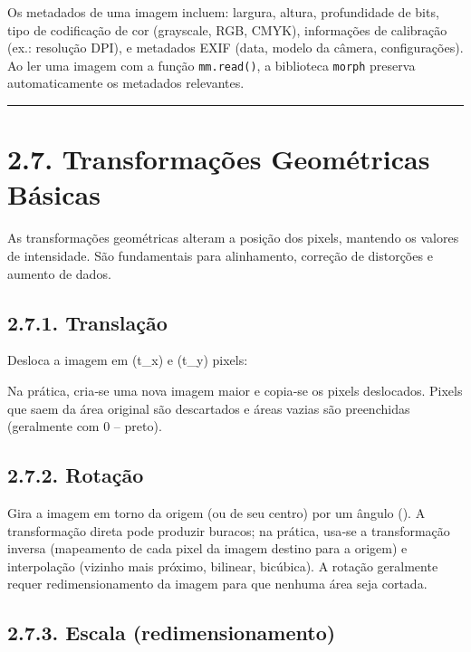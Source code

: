 \documentclass[
  portuguese,
  letterpaper,
  openany,
  oneside,
  12pt,
  a4paper]{book}
\begin{document}
\begin{tcolorbox}
Os metadados de uma imagem incluem: largura, altura, profundidade de
bits, tipo de codificação de cor (grayscale, RGB, CMYK), informações de
calibração (ex.: resolução DPI), e metadados EXIF (data, modelo da
câmera, configurações). Ao ler uma imagem com a função
\texttt{mm.read()}, a biblioteca \texttt{morph} preserva automaticamente
os metadados relevantes.

\begin{center}\rule{0.5\linewidth}{0.5pt}\end{center}

\section{2.7. Transformações Geométricas
Básicas}\label{transformauxe7uxf5es-geomuxe9tricas-buxe1sicas}

As transformações geométricas alteram a posição dos pixels, mantendo os
valores de intensidade. São fundamentais para alinhamento, correção de
distorções e aumento de dados.

\subsection{2.7.1. Translação}\label{translauxe7uxe3o}

Desloca a imagem em (t\_x) e (t\_y) pixels:

Na prática, cria‑se uma nova imagem maior e copia‑se os pixels
deslocados. Pixels que saem da área original são descartados e áreas
vazias são preenchidas (geralmente com 0 -- preto).

\subsection{2.7.2. Rotação}\label{rotauxe7uxe3o}

Gira a imagem em torno da origem (ou de seu centro) por um ângulo
(\theta). A transformação direta pode produzir buracos; na prática,
usa‑se a transformação inversa (mapeamento de cada pixel da imagem
destino para a origem) e interpolação (vizinho mais próximo, bilinear,
bicúbica). A rotação geralmente requer redimensionamento da imagem para
que nenhuma área seja cortada.

\subsection{2.7.3. Escala
(redimensionamento)}\label{escala-redimensionamento}


\end{tcolorbox}
\end{document}

